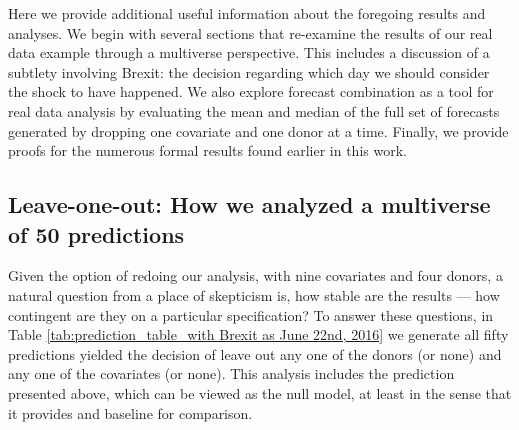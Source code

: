 \documentclass[11pt,3p,review,authoryear]{elsarticle}
\theoremstyle{definition}
\begin{document}
Here we provide additional useful information about the foregoing results and analyses.  We begin with several sections that re-examine the results of our real data example through a multiverse perspective.  This includes a discussion of a subtlety involving Brexit: the decision regarding which day we should consider the shock to have happened.  We also explore forecast combination as a tool for real data analysis by evaluating the mean and median of the full set of forecasts generated by dropping one covariate and one donor at a time.  Finally, we provide proofs for the numerous formal results found earlier in this work.

\subsection{Leave-one-out: How we analyzed a multiverse of 50 predictions}

Given the option of redoing our analysis, with nine covariates and four donors, a natural question from a place of skepticism is, how stable are the results --- how contingent are they on a particular specification?  To answer these questions, in Table \ref{tab:prediction_table_with Brexit as June 22nd, 2016} we generate all fifty predictions yielded the decision of leave out any one of the donors (or none) and any one of the covariates (or none).  This analysis includes the prediction presented above, which can be viewed as the null model, at least in the sense that it provides and baseline for comparison. 
\end{document}
